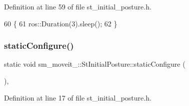 Definition at line 59 of file st\+\_\+initial\+\_\+posture.\+h.


\begin{DoxyCode}
60     \{
61         ros::Duration(3).sleep();
62     \}
\end{DoxyCode}
\mbox{\label{structsm__moveit__3_1_1StInitialPosture_aa22570b3121559db381a808aa0052d0b}} 
\subsubsection{\texorpdfstring{static\+Configure()}{staticConfigure()}}
{\footnotesize\ttfamily static void sm\+\_\+moveit\+\_\+::\+St\+Initial\+Posture\+::static\+Configure (\begin{DoxyParamCaption}{ }\end{DoxyParamCaption})\hspace{0.3cm}{\ttfamily [inline]}, {\ttfamily [static]}}



Definition at line 17 of file st\+\_\+initial\+\_\+posture.\+h.


